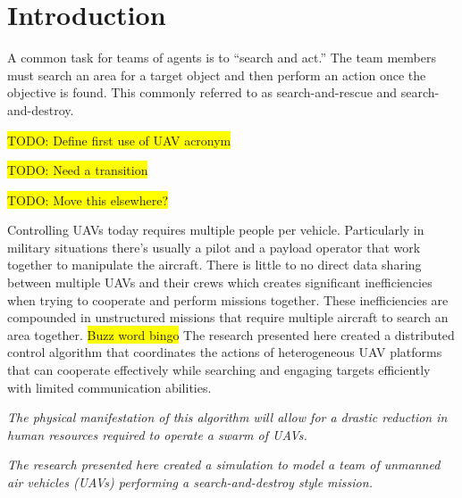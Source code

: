 \chapter{Introduction}
A common task for teams of agents is to ``search and act.''  The team members must search an area for a target object and then perform an action once the objective is found.  This commonly referred to as search-and-rescue and search-and-destroy.

\colorbox{yellow}{TODO: Define first use of UAV acronym}

\colorbox{yellow}{TODO: Need a transition}

\colorbox{yellow}{TODO: Move this elsewhere?}

Controlling UAVs today requires multiple people per vehicle.  Particularly in military situations there’s usually a pilot and a payload operator that work together to manipulate the aircraft.  There is little to no direct data sharing between multiple UAVs and their crews which creates significant inefficiencies when trying to cooperate and perform missions together.  These inefficiencies are compounded in unstructured missions that require multiple aircraft to search an area together.  \colorbox{yellow}{Buzz word bingo} The research presented here created a distributed control algorithm that coordinates the actions of heterogeneous UAV platforms that can cooperate effectively while searching and engaging targets efficiently with limited communication abilities.

\textit{The physical manifestation of this algorithm will allow for a drastic reduction in human resources required to operate a swarm of UAVs.}

\textit{The research presented here created a simulation to model a team of unmanned air vehicles (UAVs) performing a search-and-destroy style mission.  }

